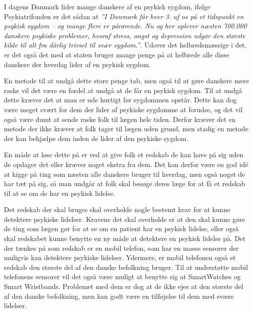 


I dagens Danmark lider mange danskere af en psykisk sygdom, ifølge Psykiatrifonden er det sådan at \textit{''I Danmark får hver 3. af os på et tidspunkt en psykisk sygdom – og mange flere er pårørende. Nu og her oplever næsten 700.000 danskere psykiske problemer, hvoraf stress, angst og depression udgør den største kilde til alt fra dårlig trivsel til svær sygdom.''}\cite{psykiatrifonden}.
Udover det helbredsmæssige i det, er det også det med at staten bruger mange penge på at helbrede alle disse danskere der hverdag lider af en psykisk sygdom.

En metode til at undgå dette store penge tab, men også til at gøre danskere mere raske vil det være en fordel at undgå at de får en psykisk sygdom.
Til at undgå dette kræver det at man er ude hurtigt før sygdommen opstår.
Dette kan dog være meget svært for dem der lider af psykiske sygdomme at forudse, og det vil også være dumt at sende raske folk til lægen hele tiden.
Derfor kræver det en metode der ikke kræver at folk tager til lægen uden grund, men stadig en metode der kan behjælpe dem inden de lider af den psykiske sygdom.

En måde at løse dette på er ved at give folk et redskab de kan have på sig uden de opdager det eller kræver noget ekstra fra dem.
Det kan derfor være en god idé at kigge på ting som næsten alle danskere bruger til hverdag, men også noget de har tæt på sig, så man undgår at folk skal besøge deres læge for at få et redskab til at se om de har en psykisk lidelse.

Det redskab der skal bruges skal overholde nogle bestemt krav for at kunne detektere psykiske lidelser.
Kravene det skal overholde er at den skal kunne gøre de ting som lægen gør for at se om en patient har en psykisk lidelse, eller også skal redskabet kunne benytte en ny måde at detektere en psykisk lidelse på.
Det der tænkes på som redskab er en mobil telefon, som har en masse sensorer der muligvis kan detektere psykiske lidelser. 
Ydermere, er mobil telefonen også et redskab den største del af den danske befolkning bruger.
Til at understøtte mobil telefonens sensorer vil det også være muligt at benytte sig at SmartWatches og Smart Wristbands.
Problemet med dem er dog at de ikke ejes at den største del af den danske befolkning, men kan godt være en tilføjelse til dem med svære lidelser.